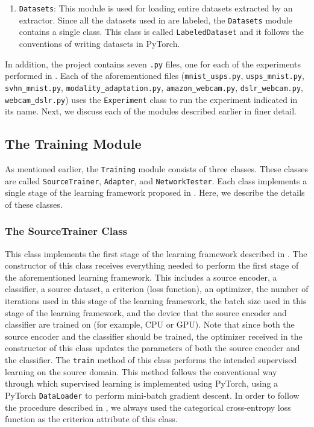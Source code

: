 \documentclass[14pt]{extarticle}
\begin{document}
\begin{enumerate}
			\item \texttt{Datasets}: This module is used for loading entire datasets extracted by an extractor. Since all the datasets used in \cite{adda} are labeled, the \texttt{Datasets} module contains a single class. This class is called \texttt{LabeledDataset} and it follows the conventions of writing datasets in PyTorch.
		\end{enumerate}
		In addition, the project contains seven \texttt{.py} files, one for each of the experiments performed in \cite{adda}. Each of the aforementioned files (\texttt{mnist\_usps.py}, \texttt{usps\_mnist.py}, \texttt{svhn\_mnist.py}, \texttt{modality\_adaptation.py}, \texttt{amazon\_webcam.py}, \texttt{dslr\_webcam.py}, \texttt{webcam\_dslr.py}) uses the \texttt{Experiment} class to run the experiment indicated in its name. Next, we discuss each of the modules described earlier in finer detail.
		\subsection{The Training Module}
		As mentioned earlier, the \texttt{Training} module consists of three classes. These classes are called \texttt{SourceTrainer}, \texttt{Adapter}, and \texttt{NetworkTester}. Each class implements a single stage of the learning framework proposed in \cite{adda}. Here, we describe the details of these classes.
		\subsubsection{The SourceTrainer Class}
		This class implements the first stage of the learning framework described in \cite{adda}. The constructor of this class receives everything needed to perform the first stage of the aforementioned learning framework. This includes a source encoder, a classifier, a source dataset, a criterion (loss function), an optimizer, the number of iterations used in this stage of the learning framework, the batch size used in this stage of the learning framework, and the device that the source encoder and classifier are trained on (for example, CPU or GPU). Note that since both the source encoder and the classifier should be trained, the optimizer received in the constructor of this class updates the parameters of both the source encoder and the classifier. The \texttt{train} method of this class performs the intended supervised learning on the source domain. This method follows the conventional way through which supervised learning is implemented using PyTorch, using a PyTorch \texttt{DataLoader} to perform mini-batch gradient descent. In order to follow the procedure described in \cite{adda}, we always used the categorical cross-entropy loss function as the criterion attribute of this class.
\end{document}
